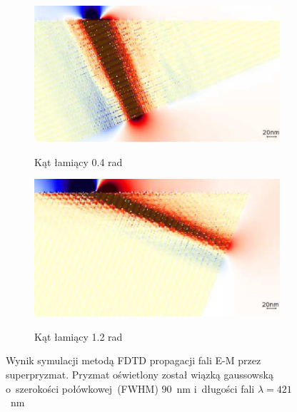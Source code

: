 \begin{figure}[btH]
	\centering
			\begin{subfigure}{0.45\textwidth}
				\includegraphics[width=\textwidth]{images/multilayer/prism04.png} \\
				\caption{Kąt łamiący 0.4 rad}
			\end{subfigure}
			\begin{subfigure}{0.45\textwidth}
				\includegraphics[width=\textwidth]{images/multilayer/prism12.png}\\
				\caption{Kąt łamiący 1.2 rad}
			\end{subfigure}
	\caption{Wynik symulacji metodą FDTD propagacji fali E-M przez superpryzmat. Pryzmat oświetlony został wiązką gaussowską o~szerokości połówkowej~(FWHM) $90$~nm i~długości fali $\lambda=421$~nm~\cite{prism2010}}
\end{figure}

